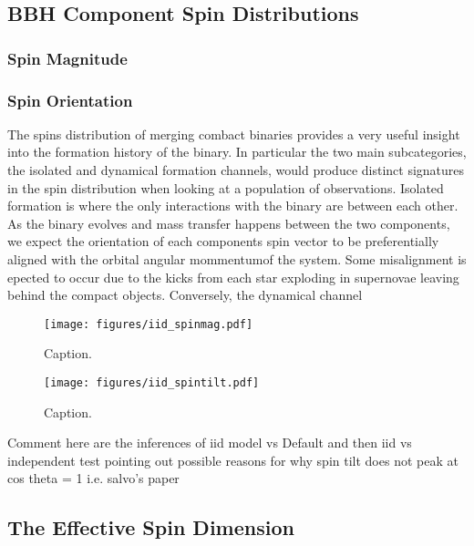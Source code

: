 \subsection{BBH Component Spin Distributions} \label{sec:spin_dist}

\subsubsection{Spin Magnitude}

\subsubsection{Spin Orientation}

The spins distribution of merging combact binaries provides a very useful insight into the formation history of the binary. In particular the two main subcategories, 
the isolated and dynamical formation channels, would produce distinct signatures in the spin distribution when looking at a population of observations. Isolated formation
is where the only interactions with the binary are between each other. As the binary evolves and mass transfer happens between the two components, we expect the orientation
of each components spin vector to be preferentially aligned with the orbital angular mommentumof the system. Some misalignment is epected to occur due to the kicks from 
each star exploding in supernovae leaving behind the compact objects. Conversely, the dynamical channel     
\begin{figure}
    \texttt{[image: figures/iid\_spinmag.pdf]}
    \caption{Caption.}
    \label{fig:iid_spinmag_dist}
\end{figure}

\begin{figure}
    \texttt{[image: figures/iid\_spintilt.pdf]}
    \caption{Caption.}
    \label{fig:iid_spintilt_dist}
\end{figure}

Comment here are the inferences of iid model vs Default and then iid vs independent test pointing out possible reasons for why spin tilt 
does not peak at cos theta = 1 i.e. salvo's paper

\subsection{The Effective Spin Dimension}

